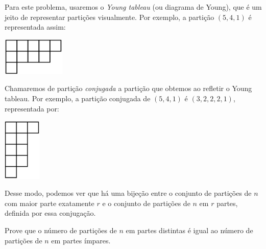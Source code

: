 \documentclass[10pt, a4paper]{article}
\begin{document}
	\begin{sol}[Bijeção]
		Para este problema, usaremos o \emph{Young tableau} (ou diagrama de Young), que é um jeito de representar partições visualmente. Por exemplo, a partição $(5, 4, 1)$ é representada assim:
		\begin{center}
			\includegraphics[width = 3cm]{fig1.png}
		\end{center}
		
		Chamaremos de partição \emph{conjugada} a partição que obtemos ao refletir o Young tableau. Por exemplo, a partição conjugada de $(5, 4, 1)$ é $(3, 2, 2, 2, 1)$, representada por:
		\begin{center}
			\includegraphics[height = 3cm]{fig2.png}
		\end{center}

		Desse modo, podemos ver que há uma bijeção entre o conjunto de partições de $n$ com maior parte exatamente $r$ e o conjunto de partições de $n$ em $r$ partes, definida por essa conjugação.
	\end{sol}



	\newpage
	\setcounter{prob}{3}

	\begin{prob}
		Prove que o número de partições de $n$ em partes distintas é igual ao número de partições de $n$ em partes ímpares.
	\end{prob}
\end{document}
